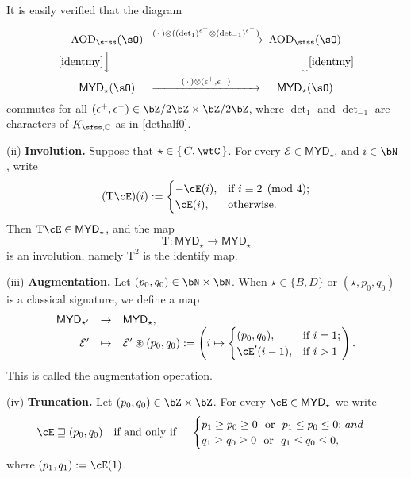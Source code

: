 \documentclass[11pt,a4paper]{amsart}
\def\MYD{{\mathsf{MYD}}}
\newcommand{\CE}{{\mathcal {E}}}
\newcommand{\be}{\begin {equation}}
\newcommand{\ee}{\end {equation}}
\numberwithin{equation}{section}
\theoremstyle{remark}
\def\maltese{\mathrm{T}}
\def\MYD{{\mathsf{MYD}}}
\def\AOD{\mathrm{AOD}}
\begin{document}
It is easily verified that the diagram 
\[
 \begin{CD}
       \AOD_{\sfss}(\sO)
                  @>  (\,\cdot\,) \otimes((\det_1)^{\epsilon^+}\otimes (\det_{-1})^{\epsilon^-}) >>  \AOD_{\sfss}(\sO)\\
            @V  \eqref{identmy}  VV         @ VV  \eqref{identmy} V \\
     \MYD_\star (\sO)
                  @>\qquad \ (\,\cdot\,)  \otimes(\epsilon^{+},\epsilon^{-})\ \qquad  >>  \MYD_\star (\sO)
  \end{CD}
\]
commutes for all $(\epsilon^{+},\epsilon^{-})\in \bZ/2\bZ\times \bZ/2\bZ$, where $\det_{1}$ and $\det_{-1}$ are characters of $K_{\sfss,\C}$ as in \eqref{dethalf0}.



\medskip
(ii) {\bf  Involution.}
Suppose that $\star\in \set{C,\wtC}$. For every $\CE\in \MYD_{\star}$, and $i\in \bN^+$, write
\begin{equation}\label{eq:inv}
(\maltese\cE)(i) := \begin{cases}
  -\cE(i),& \text{if $i\equiv 2 \pmod{4}$;}\\
  \cE(i), & \text{otherwise.}
\end{cases}
\end{equation}
Then $\maltese\cE\in \MYD_{\star}$, and the map
\be\label{tinv}
  \mathrm T: \MYD_{\star}\rightarrow \MYD_{\star}
  \ee
  is an involution, namely $\mathrm T^2$ is the identify map.
  
\medskip

(iii) {\bf  Augmentation.}
Let $(p_{0},q_{0})\in \bN\times \bN$. When $\star\in \{B,D\}$ or  
$ (\star,p_{0},q_{0})$ is a classical signature, we define a map
\be\label{aug}
  \begin{array}{rcl}
  \MYD_{\star'}&\rightarrow & \MYD_{\star},\\
  \CE'&\mapsto & \CE'\circledast (p_0,q_0):=\left(i\mapsto \begin{cases}
    (p_0,q_0), & \text{if } i=1;\\
    \cE'(i-1), & \text{if } i>1
  \end{cases}\right).
  \end{array}
\ee
This is called the augmentation operation. 

\medskip

(iv) {\bf  Truncation.}
Let $(p_{0},q_{0})\in \bZ\times \bZ$. For  every $\cE\in \MYD_{\star}$  
we write
\begin{equation}
  \label{eq:sub}
  \cE\sqsupseteq (p_{0},q_{0}) \quad \textrm{if and only if } \quad 
  \begin{cases}
  p_{1}\geq p_0 \geq 0  \ \text{ or }\ 
  p_{1}\leq p_0 \leq 0; $\ $ and \\
  q_{1}\geq q_0 \geq 0 \  \text{ or } \ 
  q_{1}\leq q_0 \leq 0, \\
  \end{cases} 
\end{equation}
where $ (p_{1},q_{1}):=\cE(1)$.
\end{document}

